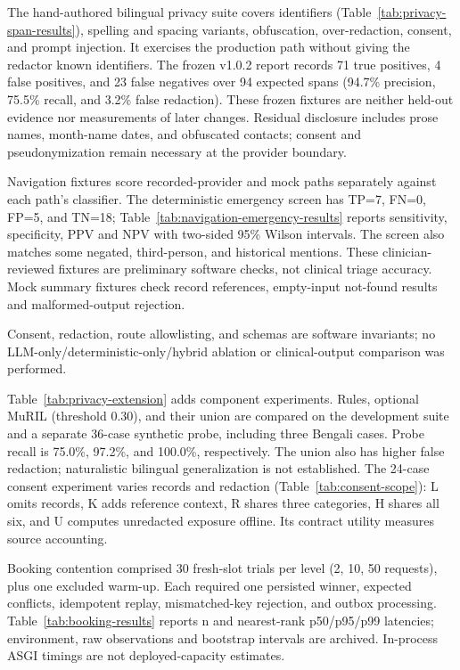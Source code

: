 \documentclass[preprint,12pt,a4paper]{elsarticle}
\begin{document}
The hand-authored bilingual privacy suite covers identifiers
(Table~\ref{tab:privacy-span-results}), spelling and spacing variants, obfuscation,
over-redaction, consent, and prompt injection. It exercises the production path without
giving the redactor known identifiers.
The frozen v1.0.2 report records 71 true positives, 4 false positives, and 23 false negatives
over 94 expected spans (94.7\% precision, 75.5\% recall, and 3.2\% false redaction).
These frozen fixtures are neither held-out evidence nor measurements of later changes. Residual disclosure includes prose names, month-name dates, and obfuscated
contacts; consent and pseudonymization remain necessary at the provider boundary.

Navigation fixtures score recorded-provider and mock paths separately against each
path's classifier. The deterministic emergency screen has
TP=7, FN=0, FP=5, and TN=18; Table~\ref{tab:navigation-emergency-results} reports
sensitivity, specificity, PPV and NPV with two-sided 95\% Wilson intervals. The screen
also matches some negated, third-person, and historical mentions. These clinician-reviewed
fixtures are preliminary software checks, not clinical triage accuracy.
Mock summary fixtures check record references, empty-input not-found results and
malformed-output rejection.

Consent, redaction, route allowlisting, and schemas are software invariants; no
LLM-only/deterministic-only/hybrid ablation or clinical-output comparison was performed.

Table~\ref{tab:privacy-extension} adds component experiments.
Rules, optional MuRIL (threshold 0.30), and their union are compared on the development
suite and a separate 36-case synthetic probe, including three Bengali cases. Probe recall
is 75.0\%, 97.2\%, and 100.0\%, respectively. The union also has higher false redaction;
naturalistic bilingual generalization is not established.
The 24-case consent experiment varies records and redaction (Table~\ref{tab:consent-scope}):
L omits records, K adds reference context, R shares three categories, H shares all six,
and U computes unredacted exposure offline. Its contract utility measures source accounting.

Booking contention comprised 30 fresh-slot trials per level (2, 10, 50 requests), plus one
excluded warm-up. Each required one persisted winner, expected conflicts, idempotent replay,
mismatched-key rejection, and outbox processing. Table~\ref{tab:booking-results} reports n
and nearest-rank p50/p95/p99 latencies; environment, raw observations and bootstrap
intervals are archived. In-process ASGI timings are not
deployed-capacity estimates.
\end{document}
